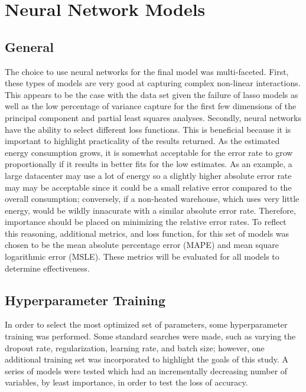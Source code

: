 
\section{Neural Network Models}
\label{sec:nn_models}

\subsection{General}
The choice to use neural networks for the final model was multi-faceted.  First, these types of models are very good at capturing complex non-linear interactions.  This appears to be the case with the data set given the failure of lasso models as well as the low percentage of variance capture for the first few dimensions of the principal component and partial least squares analyses.  Secondly, neural networks have the ability to select different loss functions.  This is beneficial because it is important to highlight practicality of the results returned.  As the estimated energy consumption grows, it is somewhat acceptable for the error rate to grow proportionally if it results in better fits for the low estimates.  As an example, a large datacenter may use a lot of energy so a slightly higher absolute error rate may may be acceptable since it could be a small relative error compared to the overall consumption; conversely, if a non-heated warehouse, which uses very little energy, would be wildly innacurate with a similar absolute error rate.  Therefore, importance should be placed on minimizing the relative error rates.  To reflect this reasoning, additional metrics, and loss function, for this set of models was chosen to be the mean absolute percentage error (MAPE) and mean square logarithmic error (MSLE).  These metrics will be evaluated for all models to determine effectiveness.

\subsection{Hyperparameter Training}
In order to select the most optimized set of parameters, some hyperparameter training was performed.  Some standard searches were made, such as varying the dropout rate, regularization, learning rate, and batch size; however, one additional training set was incorporated to highlight the goals of this study.  A series of models were tested which had an incrementally decreasing number of variables, by least importance, in order to test the loss of accuracy.

